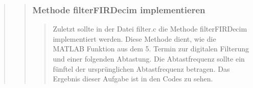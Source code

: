 \begin{quote}
\begin{quote}
\begin{quote}
		\end{quote}
		
		\subsubsection{Methode filterFIRDecim implementieren}
		\begin{quote}
		
		Zuletzt sollte in der Datei filter.c die Methode filterFIRDecim implementiert
		werden. Diese Methode dient, wie die MATLAB Funktion aus dem 5. Termin zur
		digitalen Filterung und einer folgenden Abtastung. Die Abtastfrequenz sollte
		ein fünftel der ursprünglichen Abtastfrequenz betragen. Das Ergebnis dieser
		Aufgabe ist in den Codes zu sehen.
		
		\end{quote}
	
	\end{quote}%
\end{quote}%

